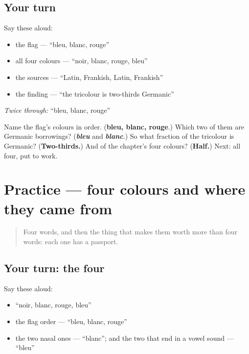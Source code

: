 \subsection*{Your turn}
Say these aloud:

\begin{itemize}
\raggedright
  \item the flag — \textquotedblleft{}bleu, blanc, rouge\textquotedblright{}
  \item all four colours — \textquotedblleft{}noir, blanc, rouge, bleu\textquotedblright{}
  \item the sources — \textquotedblleft{}Latin, Frankish, Latin, Frankish\textquotedblright{}
  \item the finding — \textquotedblleft{}the tricolour is two-thirds Germanic\textquotedblright{}
\end{itemize}

\emph{Twice through:} \textquotedblleft{}bleu, blanc, rouge\textquotedblright{}

\begin{tcolorbox}[breakable,colback=teal!4,colframe=teal!35!black,title={Before you move on}]
Name the flag's colours in order. (\textbf{bleu, blanc, rouge}.) Which two of them are Germanic borrowings? (\emph{\textbf{bleu}} and \emph{\textbf{blanc}}.) So what fraction of the tricolour is Germanic? (\textbf{Two-thirds.}) And of the chapter's four colours? (\textbf{Half.}) Next: all four, put to work.
\end{tcolorbox}
\section[Practice]{Practice — four colours and where they came from}

\label{lesson:FR-C13-practice}



\begin{quote}
Four words, and then the thing that makes them worth more than four words: each one has a passport.
\end{quote}

\subsection*{Your turn: the four}
Say these aloud:

\begin{itemize}
\raggedright
  \item \textquotedblleft{}noir, blanc, rouge, bleu\textquotedblright{}
  \item the flag order — \textquotedblleft{}bleu, blanc, rouge\textquotedblright{}
  \item the two nasal ones — \textquotedblleft{}blanc\textquotedblright{}; and the two that end in a vowel sound — \textquotedblleft{}bleu\textquotedblright{}
\end{itemize}


